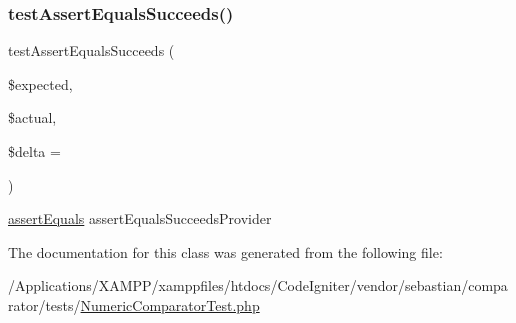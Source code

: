 \subsubsection{\texorpdfstring{test\+Assert\+Equals\+Succeeds()}{testAssertEqualsSucceeds()}}
{\footnotesize\ttfamily test\+Assert\+Equals\+Succeeds (\begin{DoxyParamCaption}\item[{}]{\$expected,  }\item[{}]{\$actual,  }\item[{}]{\$delta = {} }\end{DoxyParamCaption})}

\mbox{\hyperlink{_functions_8php_a441ec5f09711b6271edda774132eec5f}{assert\+Equals}}  assert\+Equals\+Succeeds\+Provider 

The documentation for this class was generated from the following file\+:\begin{DoxyCompactItemize}
\item 
/\+Applications/\+X\+A\+M\+P\+P/xamppfiles/htdocs/\+Code\+Igniter/vendor/sebastian/comparator/tests/\mbox{\hyperlink{_numeric_comparator_test_8php}{Numeric\+Comparator\+Test.\+php}}\end{DoxyCompactItemize}
